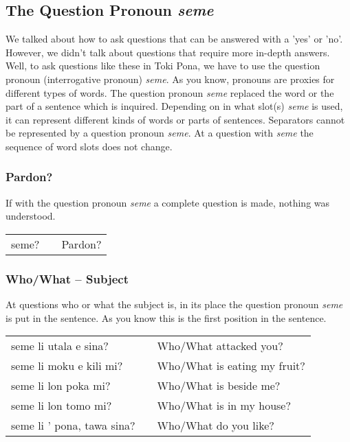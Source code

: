 \subsection*{The Question Pronoun \textit{seme}}
%
We talked about how to ask questions that can be answered with a 'yes' or 'no'. 
However, we didn't talk about questions that require more in-depth answers. 
Well, to ask questions like these in Toki Pona, we have to use the question pronoun (interrogative pronoun) \textit{seme}. 
As you know, pronouns are proxies for different types of words.
The question pronoun \textit{seme} replaced the word or the part of a sentence which is inquired.
Depending on in what slot(s) \textit{seme} is used, it can represent different kinds of words or parts of sentences. 
Separators cannot be represented by a question pronoun \textit{seme}. 
At a question with \textit{seme} the sequence of word slots does not change. 
%
\subsubsection*{Pardon?}
%
If with the question pronoun \textit{seme} a complete question is made, nothing was understood. 

\begin{supertabular}{p{5,5cm}|ll}
seme? && Pardon? \\
\end{supertabular} 
%
\subsubsection*{Who/What -- Subject}
%
At questions who or what the subject is, in its place the question pronoun \textit{seme} is put in the sentence.
As you know this is the first position in the sentence. 

\begin{supertabular}{p{5,5cm}|ll}
seme li utala e sina? && Who/What attacked you? \\
seme li moku e kili mi? && Who/What is eating my fruit? \\
seme li lon poka mi? && Who/What is beside me? \\
seme li lon tomo mi? && Who/What is in my house? \\
seme li ' pona, tawa sina? && Who/What do you like? \\ 
\end{supertabular} 
%
